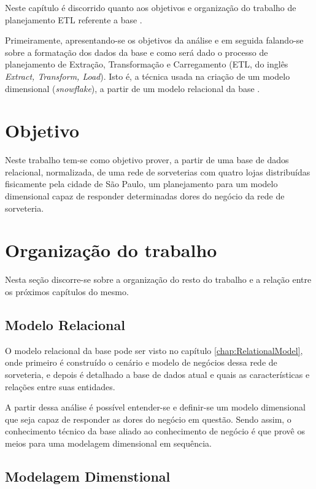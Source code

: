 \label{chap:Introduction} Neste capítulo é discorrido quanto aos objetivos e organização do trabalho de planejamento ETL referente a base \emph{\databaseName}. 

Primeiramente, apresentando-se os objetivos da análise e em seguida falando-se sobre a formatação dos dados da base e como será dado o processo de planejamento de Extração, Transformação e Carregamento (ETL, do inglês \emph{Extract, Transform, Load}). Isto é, a técnica usada na criação de um modelo dimensional (\emph{snowflake}), a partir de um modelo relacional da base \emph{\databaseName}. 

\section{Objetivo}

Neste trabalho tem-se como objetivo prover, a partir de uma base de dados relacional, normalizada,
de uma rede de sorveterias com quatro lojas distribuídas fisicamente pela cidade de São Paulo, 
um planejamento para um modelo dimensional capaz de responder determinadas dores do negócio da
rede de sorveteria.

\section {Organização do trabalho}

Nesta seção discorre-se sobre a organização do resto do trabalho e a relação entre os próximos capítulos do mesmo.

\subsection{Modelo Relacional}

O modelo relacional da base \emph{\databaseName{}} pode ser visto no capítulo \ref{chap:RelationalModel}, onde primeiro é construído o cenário e modelo de negócios dessa rede de sorveteria, e depois é detalhado a base de dados atual e quais as características e relações entre suas entidades.

A partir dessa análise é possível entender-se e definir-se um modelo dimensional que seja capaz de responder as dores do negócio em questão. Sendo assim, o conhecimento técnico da base aliado ao conhecimento de negócio é que provê os meios para uma modelagem dimensional em sequência.

\subsection{Modelagem Dimenstional}

